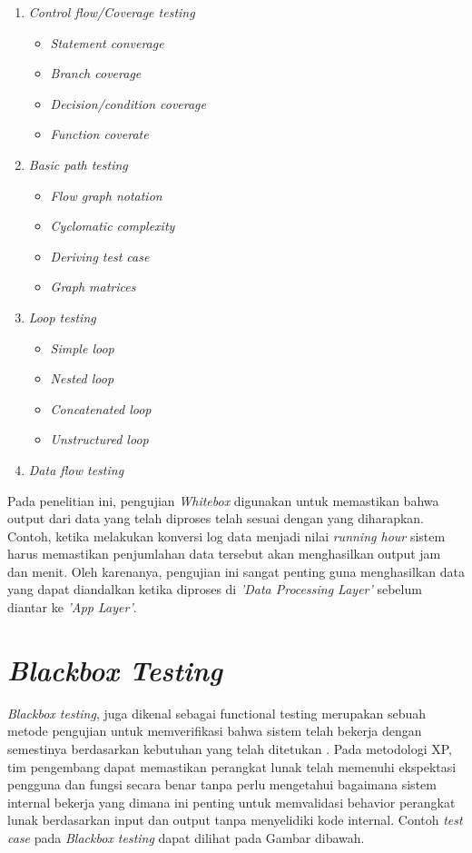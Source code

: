 \begin{enumerate}
    \item \textit{Control flow/Coverage testing}
    \begin{itemize}
        \item \textit{Statement converage}
        \item \textit{Branch coverage}
        \item \textit{Decision/condition coverage}
        \item \textit{Function coverate}
    \end{itemize}

    \item \textit{Basic path testing}
    \begin{itemize}
        \item \textit{Flow graph notation}
        \item \textit{Cyclomatic complexity}
        \item \textit{Deriving test case}
        \item \textit{Graph matrices}
    \end{itemize}

    \item \textit{Loop testing}
    \begin{itemize}
        \item \textit{Simple loop}
        \item \textit{Nested loop}
        \item \textit{Concatenated loop}
        \item \textit{Unstructured loop}
    \end{itemize}

    \item \textit{Data flow testing}
\end{enumerate}

Pada penelitian ini, pengujian \textit{Whitebox} digunakan untuk memastikan bahwa output dari data yang telah diproses telah sesuai dengan yang diharapkan. Contoh, ketika melakukan konversi log data menjadi nilai \textit{running hour} sistem harus memastikan penjumlahan data tersebut akan menghasilkan output jam dan menit. Oleh karenanya, pengujian ini sangat penting guna menghasilkan data yang dapat diandalkan ketika diproses di \textit{'Data Processing Layer'} sebelum diantar ke \textit{'App Layer'}.

\section{\textit{Blackbox Testing}}
\textit{Blackbox testing}, juga dikenal sebagai functional testing merupakan sebuah metode pengujian untuk memverifikasi bahwa sistem telah bekerja dengan semestinya berdasarkan kebutuhan yang telah ditetukan \parencite{article:noerlina}. Pada metodologi XP, tim pengembang dapat memastikan perangkat lunak telah memenuhi ekspektasi pengguna dan fungsi secara benar tanpa perlu mengetahui bagaimana sistem internal bekerja yang dimana ini penting untuk memvalidasi behavior perangkat lunak berdasarkan input dan output tanpa menyelidiki kode internal. Contoh \textit{test case} pada \textit{Blackbox testing} dapat dilihat pada Gambar dibawah.

